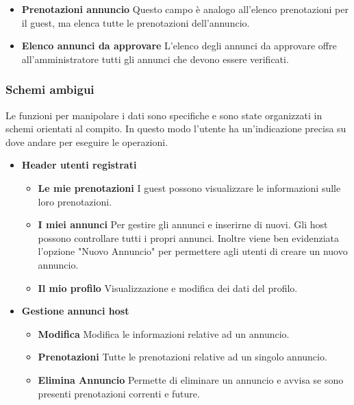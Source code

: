 \documentclass[1_relazione.tex]{subfiles}
\begin{document}
\begin{itemize}
        \item \textbf{Prenotazioni annuncio} Questo campo \`{e} analogo all'elenco prenotazioni per il guest, ma elenca tutte le prenotazioni dell'annuncio.

        \item \textbf{Elenco annunci da approvare}
        L'elenco degli annunci da approvare offre all'amministratore tutti gli annunci che devono essere verificati.

    \end{itemize}

    \subsubsection{Schemi ambigui}
    Le funzioni per manipolare i dati sono specifiche e sono state organizzati in schemi orientati al compito. In questo modo l'utente ha un'indicazione precisa su dove andare per eseguire le operazioni.

    \begin{itemize}
        \item \textbf{Header utenti registrati}
        \begin{itemize}
            \item \textbf{Le mie prenotazioni} I guest possono visualizzare le informazioni sulle loro prenotazioni.
            \item \textbf{I miei annunci} Per gestire gli annunci e inserirne di nuovi. Gli host possono controllare tutti i propri annunci. Inoltre viene ben evidenziata l'opzione "Nuovo Annuncio" per permettere agli utenti di creare un nuovo annuncio.
            \item \textbf{Il mio profilo} Visualizzazione e modifica dei dati del profilo.
        \end{itemize}

        \item \textbf{Gestione annunci host}
        \begin{itemize}
            \item \textbf{Modifica} Modifica le informazioni relative ad un annuncio.
            \item \textbf{Prenotazioni} Tutte le prenotazioni relative ad un singolo annuncio.
            \item \textbf{Elimina Annuncio} Permette di eliminare un annuncio e avvisa se sono presenti prenotazioni correnti e future.
        \end{itemize}
    \end{itemize}
\end{document}
